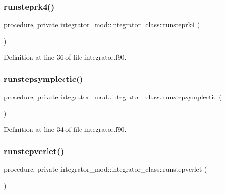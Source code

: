 \subsubsection{\texorpdfstring{runsteprk4()}{runsteprk4()}}
{\footnotesize\ttfamily procedure, private integrator\+\_\+mod\+::integrator\+\_\+class\+::runsteprk4 (\begin{DoxyParamCaption}{ }\end{DoxyParamCaption})\hspace{0.3cm}{\ttfamily [private]}}



Definition at line 36 of file integrator.\+f90.

\mbox{\label{structintegrator__mod_1_1integrator__class_a47a8eecf5333b28f07de1d9899b8aadf}} 
\subsubsection{\texorpdfstring{runstepsymplectic()}{runstepsymplectic()}}
{\footnotesize\ttfamily procedure, private integrator\+\_\+mod\+::integrator\+\_\+class\+::runstepsymplectic (\begin{DoxyParamCaption}{ }\end{DoxyParamCaption})\hspace{0.3cm}{\ttfamily [private]}}



Definition at line 34 of file integrator.\+f90.

\mbox{\label{structintegrator__mod_1_1integrator__class_ab67d78bd1f6db450d70c777170a00393}} 
\subsubsection{\texorpdfstring{runstepverlet()}{runstepverlet()}}
{\footnotesize\ttfamily procedure, private integrator\+\_\+mod\+::integrator\+\_\+class\+::runstepverlet (\begin{DoxyParamCaption}{ }\end{DoxyParamCaption})\hspace{0.3cm}{\ttfamily [private]}}



